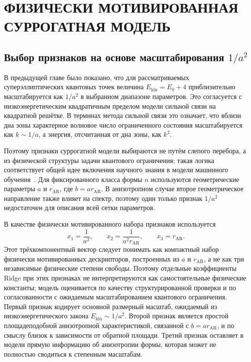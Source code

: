 \chapter{ФИЗИЧЕСКИ МОТИВИРОВАННАЯ СУРРОГАТНАЯ МОДЕЛЬ}

\section{Выбор признаков на основе масштабирования \texorpdfstring{$1/a^2$}{1/a^2}}

В предыдущей главе было показано, что для рассматриваемых суперэллиптических квантовых
точек величина $E_{\mathrm{kin}}=E_0+4$ приблизительно масштабируется как $1/a^2$ в
выбранном диапазоне параметров. Это согласуется с низкоэнергетическим квадратичным
пределом модели сильной связи на квадратной решётке. В терминах метода сильной связи это
означает, что вблизи дна зоны характерное волновое число ограниченного состояния
масштабируется как $k \sim 1/a$, а энергия, отсчитанная от дна зоны, как $k^2$.

Поэтому признаки суррогатной модели выбираются не путём слепого перебора, а из физической
структуры задачи квантового ограничения; такая логика соответствует общей идее включения
научного знания в модели машинного обучения~\cite{willard2022piml}. Для фиксированного
класса формы $n$ используются геометрические параметры $a$ и $r_{\mathrm{AR}}$, где $b=a
r_{\mathrm{AR}}$. В анизотропном случае второе геометрическое направление также влияет на
спектр, поэтому один только признак $1/a^2$ недостаточен для описания всей сетки
параметров.

В качестве физически мотивированного набора признаков используется
\begin{equation}
  x_1 = \frac{1}{a^2}, \qquad
  x_2 = \frac{1}{a^2 r_{\mathrm{AR}}}, \qquad
  x_3 = r_{\mathrm{AR}} .
\end{equation}
Этот трёхкомпонентный вектор следует понимать как компактный набор физически
мотивированных дескрипторов, построенных из $a$ и $r_{\mathrm{AR}}$, а не как три
независимые физические степени свободы. Поэтому отдельные коэффициенты Ridge при этих
признаках не интерпретируются как самостоятельные физические константы; модель оценивается
по качеству структурированной проверки и по согласованности с ожидаемым масштабированием
квантового ограничения.
Первый признак кодирует основной размерный масштаб, ожидаемый из низкоэнергетического
закона $E_{\mathrm{kin}}\sim 1/a^2$. Второй признак является простой площадеподобной
анизотропной характеристикой, связанной с $b=a r_{\mathrm{AR}}$, и по смыслу близок к
зависимости от обратной площади. Третий признак оставляет в модели прямую информацию об
анизотропии формы, которая может не полностью сводиться к степенным масштабам.

